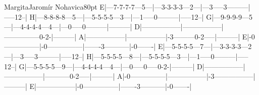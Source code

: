 \begin{song}{Margita}{Jaromír Nohavica}{80pt}
\tabs{20pt}
E|---7-7-7-7---5---|---3-3-3-3---2---|---3-----3---------|-----12--|
H|---8-8-8-8---5---|---5-5-5-5---3---|---1-----0---------|-----12--|
G|---9-9-9-9---5---|---4-4-4-4---4---|---0-----0---------|---------|
D|-----------------|-----------------|---------------0-2-|---------|
A|-----------------|-----------------|-3---------0-2-----|---------|
E|-0---------------|-0---------------|-------3-----------|-0-------|
\endtabs
\tabs{20pt}
E|---5-5-5-5---7---|---3-3-3-3---2---|---3-----3---------|-----12--|
H|---5-5-5-5---8---|---5-5-5-5---3---|---1-----0---------|-----12--|
G|---5-5-5-5---9---|---4-4-4-4---4---|---0-----0-----0-2-|---------|
D|-----------------|-----------------|-----------0-2-----|---------|
A|-0---------------|-----------------|-3-----------------|---------|
E|-----------------|-0---------------|-------3-----------|-0-------|
\endtabs
\end{song}
